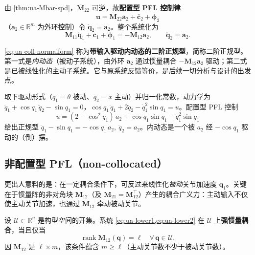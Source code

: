 由 \cref{thm:ua-Mbar-spd}，$\bar{\mathbf{M}}_{22}$ 可逆，故\textbf{配置型 PFL 控制律}
\begin{equation}\label{eq:ua-coll-law}
  \mathbf{u}=\bar{\mathbf{M}}_{22}\mathbf{a}_2+\bar{\mathbf{c}}_2+\bar{\boldsymbol{\phi}}_2
\end{equation}
（$\mathbf{a}_2\in\mathbb{R}^m$ 为外环控制）令 $\ddot{\mathbf{q}}_2=\mathbf{a}_2$。整个系统化为
\begin{equation}\label{eq:ua-coll-normalform}
  \boxed{\ \mathbf{M}_{11}\ddot{\mathbf{q}}_1+\mathbf{c}_1+\boldsymbol{\phi}_1=-\mathbf{M}_{12}\mathbf{a}_2,\qquad \ddot{\mathbf{q}}_2=\mathbf{a}_2.\ }
\end{equation}

\begin{definition}[二阶正规型]\label{def:ua-normalform}
\cref{eq:ua-coll-normalform} 称为\textbf{带输入驱动内动态的二阶正规型}，简称二阶正规型。第一式是\emph{内动态}（被动子系统），由外环 $\mathbf{a}_2$ 通过惯量耦合 $-\mathbf{M}_{12}\mathbf{a}_2$ 驱动；第二式是已被线性化的主动子系统。它与原系统反馈等价，是后续一切分析与设计的出发点。
\end{definition}

\begin{example}\label{ex:ua-cart-coll}
取下驱动形式（$q_1=\theta$ 被动、$q_2=x$ 主动）并归一化常数，动力学为
$\ddot{q}_1+\cos q_1\,\ddot{q}_2-\sin q_1=0$，$\cos q_1\,\ddot{q}_1+2\ddot{q}_2-\dot{q}_1^2\sin q_1=u$。配置型 PFL 控制
\[
  u=(2-\cos^2 q_1)\,a_2+\cos q_1\sin q_1-\dot{q}_1^2\sin q_1
\]
给出正规型 $\ddot{q}_1-\sin q_1=-\cos q_1\,a_2,\ \ddot{q}_2=a_2$。内动态是一个被 $a_2$ 经 $-\cos q_1$ 驱动的（倒）摆。
\end{example}

\subsection{非配置型 PFL（non-collocated）}\label{sec:ua-noncollocated}

更出人意料的是：在一定耦合条件下，可反过来线性化\emph{被动}关节加速度 $\ddot{\mathbf{q}}_1$。关键在于惯量阵的非对角块 $\mathbf{M}_{12}$（及 $\mathbf{M}_{21}=\mathbf{M}_{12}^\top$）产生的耦合广义力：主动输入不仅使主动关节加速，也通过 $\mathbf{M}_{12}$ 牵动被动关节。

\begin{definition}[强惯量耦合]\label{def:ua-strongcoupling}
设 $\mathcal{U}\subset\mathbb{R}^n$ 是构型空间的开集。系统 \cref{eq:ua-lower1,eq:ua-lower2} 在 $\mathcal{U}$ 上\textbf{强惯量耦合}，当且仅当
\begin{equation}\label{eq:ua-strongcoupling}
  \operatorname{rank}\mathbf{M}_{12}(\mathbf{q})=\ell\quad\forall\,\mathbf{q}\in\mathcal{U}.
\end{equation}
因 $\mathbf{M}_{12}$ 是 $\ell\times m$，该条件蕴含 $m\ge\ell$（主动关节数不少于被动关节数）。
\end{definition}

